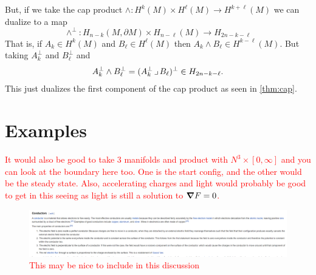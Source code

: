 \documentclass{article}
\begin{document}
But, if we take the cap product $\wedge \colon H^k(M) \times H^\ell(M) \to H^{k+\ell}(M)$ we can dualize to a map
\begin{equation}
    \wedge^\perp \colon H_{n-k}(M,\partial M) \times H_{n-\ell}(M) \to H_{2n-k-\ell}
\end{equation}
That is, if $A_k \in H^k(M)$ and $B_\ell \in H^\ell(M)$ then $A_k \wedge B_\ell \in H^{k-\ell}(M)$. But taking $A_k^\perp$ and $B_\ell^\perp$ and
\begin{align}
    A_k^\perp \wedge B_\ell^\perp = (A_k^\perp \hspace*{.5mm}\lrcorner \hspace*{.5mm} B_\ell)^\perp \in H_{2n-k-\ell}.
\end{align}
This just dualizes the first component of the cap product as seen in \cref{thm:cap}.



\section{Examples}

\textcolor{red}{It would also be good to take 3 manifolds and product with $N^3 \times [0,\infty]$ and you can look at the boundary here too. One is the start config, and the other would be the steady state. Also, accelerating charges and light would probably be good to get in this seeing as light is still a solution to $\boldsymbol{\nabla} F=0$.}

\begin{figure}[H]
    \centering
    \includegraphics[width=\textwidth]{figures/conductors.png}
    \caption{\textcolor{red}{This may be nice to include in this discussion}}
\end{figure}

\end{document}
